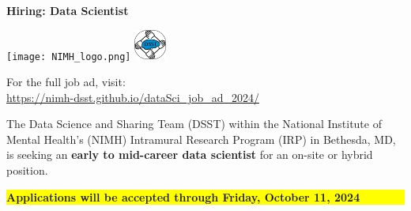 \documentclass[10pt,letterpaper]{article}
\begin{document}
\begin{minipage}[t]{0.75\textwidth}
    \LARGE\textbf{Hiring: Data Scientist}
    
    \vspace{0.2cm}
    \texttt{[image: NIMH\_logo.png]}
    \hspace{0.5cm}
    \includegraphics[height=1cm]{dsst_logo.png}
\end{minipage}%
\begin{minipage}[t]{0.25\textwidth}
    \raggedleft
    \vspace{0.1cm}
    
    \footnotesize For the full job ad, visit:\\
    \url{https://nimh-dsst.github.io/dataSci_job_ad_2024/}
\end{minipage}

\vspace{0.2cm}

\small
The Data Science and Sharing Team (DSST) within the National Institute of Mental Health's (NIMH) Intramural Research Program (IRP) in Bethesda, MD, is seeking an \textbf{early to mid-career data scientist} for an on-site or hybrid position. 

\begin{center}
\colorbox{yellow}{\parbox{0.8\textwidth}{\centering\textbf{\large Applications will be accepted through Friday, October 11, 2024}}}
\end{center}
\end{document}
